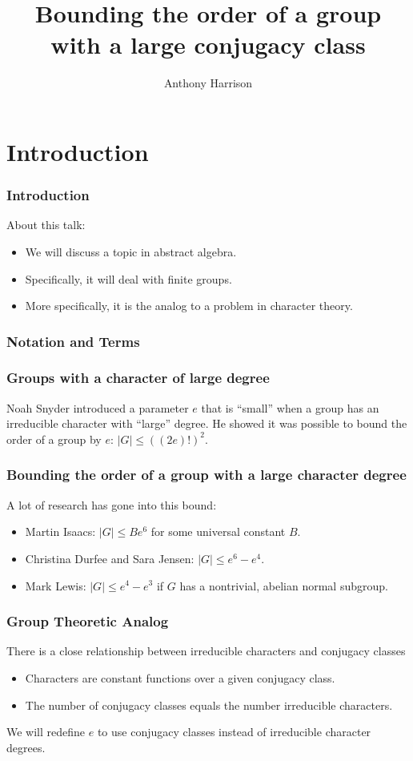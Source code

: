 \documentclass{beamer}
\title{Bounding the order of a group with a large conjugacy class}
\author{Anthony Harrison}
\institute{Texas State University-San Marcos}
\begin{document}
\begin{frame}
\titlepage
\end{frame}

\section{Introduction}

\begin{frame}
\frametitle{Introduction}
About this talk:
\begin{itemize}
	\item We will discuss a topic in abstract algebra.
	\item Specifically, it will deal with finite groups.
	\item More specifically, it is the analog to a problem in character theory.
\end{itemize}
\end{frame}

\begin{frame}
\frametitle{Notation and Terms}
\end{frame}

\begin{frame}
\frametitle{Groups with a character of large degree}
Noah Snyder introduced a parameter $e$ that is ``small'' when a group has an irreducible character with ``large'' degree.
\vskip1cm
He showed it was possible to bound the order of a group by $e$: $|G| \le ((2e)!)^2$.
\end{frame}

\begin{frame}
\frametitle{Bounding the order of a group with a large character degree}
A lot of research has gone into this bound:
\begin{itemize}
	\item Martin Isaacs: $|G| \le Be^6$ for some universal constant $B$.
	\item Christina Durfee and Sara Jensen: $|G| \le e^6 - e^4$.
	\item Mark Lewis: $|G| \le e^4 - e^3$ if $G$ has a nontrivial, abelian normal subgroup.
\end{itemize}
\end{frame}



\begin{frame}
\frametitle{Group Theoretic Analog}
There is a close relationship between irreducible characters and conjugacy classes
\begin{itemize}
	\item Characters are constant functions over a given conjugacy class.
	\item The number of conjugacy classes equals the number irreducible characters.
\end{itemize}
We will redefine $e$ to use conjugacy classes instead of irreducible character degrees.
\end{frame}
\end{document}
